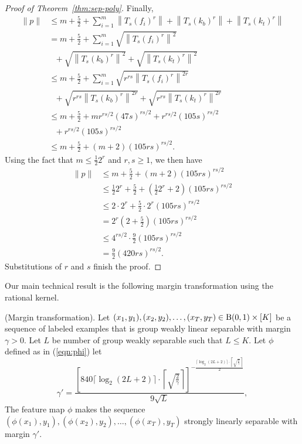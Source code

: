\begin{proof}[Proof of Theorem~\ref{thm:sep-poly}]
Finally,
\begin{align*}
    \|p\|&\leq m+\frac{5}{2}+\sum_{i=1}^m\left\|T_s(f_i)^r\right\|
    +\left\|T_s(k_b)^r\right\|+\left\|T_s(k_t)^r\right\| \\
    &=m+\frac{5}{2}+\sum_{i=1}^m\sqrt{\left\|T_s(f_i)^r\right\|^2} \\
    &\ \ \ +\sqrt{\left\|T_s(k_b)^r\right\|^2} +\sqrt{\left\|T_s(k_t)^r\right\|^2} \\
    &\leq m+\frac{5}{2}+\sum_{i=1}^m\sqrt{r^{rs}\left\|T_s(f_i)^r\right\|^{2r}} \\
    &\ \ \ +\sqrt{r^{rs}\left\|T_s(k_b)^r\right\|^{2r}}+\sqrt{r^{rs}\left\|T_s(k_t)^r\right\|^{2r}} \\
    &\leq m+\frac{5}{2}+m r^{rs/2}(47s)^{rs/2}+r^{rs/2}(105s)^{rs/2} \\ 
    &\ \ \ +r^{rs/2}(105s)^{rs/2} \\
    &\leq m+\frac{5}{2}+(m+2)(105rs)^{rs/2}.
\end{align*}
Using the fact that $m\leq\frac{1}{2}2^r$ and $r,s \geq 1$, we then have
\begin{align*}
    \|p\| &\leq m+\frac{5}{2}+(m+2)(105rs)^{rs/2} \\
        &\leq \frac{1}{2}2^r+\frac{5}{2}+\left( \frac{1}{2}2^r +2\right)(105rs)^{rs/2} \\
        &\leq 2\cdot2^r+\frac{5}{2}\cdot 2^r(105rs)^{rs/2} \\
        &= 2^r\left( 2+\frac{5}{2}\right)(105rs)^{rs/2} \\
        &\leq 4^{rs/2}\cdot\frac{9}{2}(105rs)^{rs/2} \\
        &=\frac{9}{2}(420rs)^{rs/2}.
\end{align*}
Substitutions of $r$ and $s$ finish the proof.
\end{proof}

Our main technical result is the following margin transformation using the rational kernel.

\begin{theorem}
(Margin transformation). Let $(x_1,y_1),(x_2,y_2),\ldots,(x_T,y_T)\in {\mathrm{B}}(0,1)\times [K]$
be a sequence of labeled examples that is group weakly linear separable with margin $\gamma >0$.
Let $L$ be number of group weakly separable such that $L\leq K.$
Let $\phi$ defined as in (\ref{eqn:phi}) let
\[
    \gamma' = \frac{\left[840\lceil\log_2(2L+2)\rceil\cdot\left\lceil\sqrt{\frac{2}{\gamma}}\right\rceil\right]^{-\frac{\lceil\log_2(2L+2)\rceil\cdot\left\lceil\sqrt{\frac{2}{\gamma}}\right\rceil}{2}}}{9\sqrt{L}},
\]
The feature map $\phi$ makes the sequence $(\phi (x_1),y_1),(\phi (x_2),y_2),\ldots,(\phi (x_T),y_T)$
strongly linearly separable with margin $\gamma'$.
\label{thm:margin-trans}
\end{theorem}

